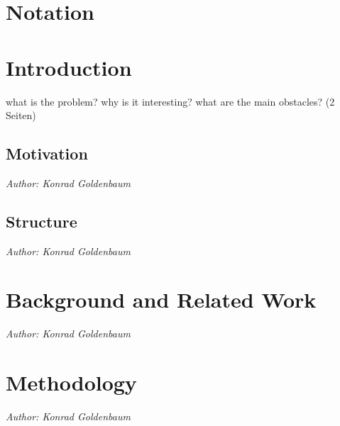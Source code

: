 \documentclass[
     12pt,         %
     a4paper,      %
     DIV=14,        %
     ]{scrreprt}
\begin{document}
{\let\clearpage\relax\chapter*{Notation}}


\newpage

\tableofcontents
\cleardoublepage
{} 



\chapter{Introduction}
\label{chap:intro}
what is the problem? why is it interesting? what are the main obstacles? (2 Seiten)

\section{Motivation}
\textit{Author: Konrad Goldenbaum}
\newline


\section{Structure}
\textit{Author: Konrad Goldenbaum}
\newline


\newpage


\chapter{Background and Related Work}
\label{chap:background}
\textit{Author: Konrad Goldenbaum}


\chapter{Methodology}
\label{chap:methodology}
\textit{Author: Konrad Goldenbaum}

\end{document}
